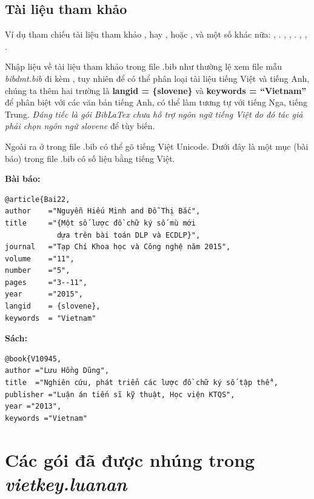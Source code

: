 \subsection{Tài liệu tham khảo}

Ví dụ tham chiếu tài liệu tham khảo \cite{V10948}, hay \cite{V10944}, hoặc \cite{S10950}, và một số khác nữa: \cite{S9619}, \cite{S10950}. \cite{S10949}, \cite{S10791}, \cite{S10541}. \cite{S10921}, \cite{S556}, \cite{K02}.

Nhập liệu về tài liệu tham khảo trong file .bib như thường lệ xem file mẫu \textit{bibdmt.bib} đi kèm , tuy nhiên để có thể phân loại tài liệu tiếng Việt và tiếng Anh, chúng ta thêm hai trường là \textbf{langid = \{slovene\}} và \textbf{keywords = ``Vietnam''} để phân biệt với các văn bản tiếng Anh, có thể làm tương tự với tiếng Nga, tiếng Trung. \textit{Đáng tiếc là gói BibLaTex chưa hỗ trợ ngôn ngữ tiếng Việt do đó tác giả phải chọn ngôn ngữ \textit{slovene}} để tùy biến.

Ngoài ra ở trong file .bib có thể gõ tiếng Việt Unicode. Dưới đây là một mục (bài báo) trong file .bib có số liệu bằng tiếng Việt.

\textbf{Bài báo:}

\begin{tcolorbox}
\begin{verbatim}
@article{Bai22,
author    ="Nguyễn Hiếu Minh and Đỗ Thị Bắc",
title     ="{Một số lược đồ chữ ký số mù mới 
            dựa trên bài toán DLP và ECDLP}",
journal   ="Tạp Chí Khoa học và Công nghệ năm 2015",
volume    ="11",
number    ="5",
pages     ="3--11", 
year      ="2015",
langid    = {slovene},
keywords  = "Vietnam"
\end{verbatim}
\end{tcolorbox}


\textbf{Sách:}

\begin{tcolorbox}
\begin{verbatim}
@book{V10945,
author ="Lưu Hồng Dũng",
title  ="Nghiên cứu, phát triển các lược đồ chữ ký số tập thể",
publisher ="Luận án tiến sĩ kỹ thuật, Học viện KTQS",
year ="2013",
keywords ="Vietnam"
\end{verbatim}
\end{tcolorbox}

\section{\bf Các gói đã được nhúng trong \textit{vietkey.luanan}}

